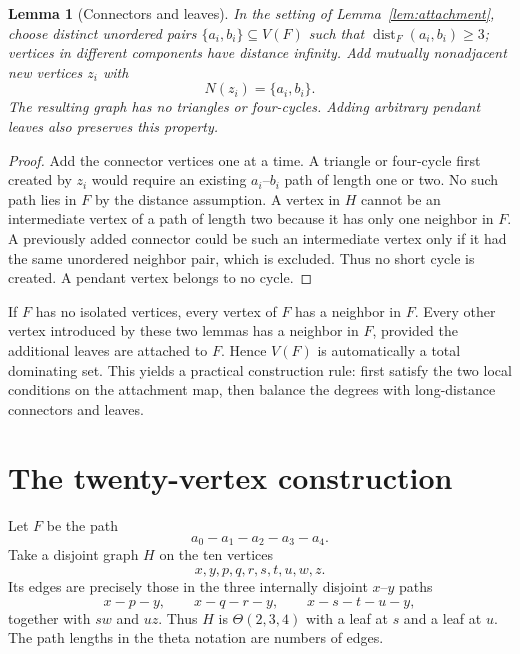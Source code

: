 \documentclass[11pt,a4paper]{article}
\newtheorem{lemma}[theorem]{Lemma}
\theoremstyle{definition}
\theoremstyle{remark}
\DeclareMathOperator{\dist}{dist}
\begin{document}
\begin{lemma}[Connectors and leaves]\label{lem:connectors}
In the setting of Lemma~\ref{lem:attachment}, choose distinct
unordered pairs $\{a_i,b_i\}\subseteq V(F)$ such that
$\dist_F(a_i,b_i)\ge3$; vertices in different components have
distance infinity. Add mutually nonadjacent new vertices $z_i$
with
\[
                  N(z_i)=\{a_i,b_i\}.
\]
The resulting graph has no triangles or four-cycles.
Adding arbitrary pendant leaves also preserves this property.
\end{lemma}

\begin{proof}
Add the connector vertices one at a time.
A triangle or four-cycle first created by $z_i$ would require an
existing $a_i$--$b_i$ path of length one or two. No such path lies
in $F$ by the distance assumption. A vertex in $H$ cannot be an
intermediate vertex of a path of length two because it has only
one neighbor in $F$. A previously added connector could be such
an intermediate vertex only if it had the same unordered
neighbor pair, which is excluded. Thus no short cycle is created.
A pendant vertex belongs to no cycle.
\end{proof}

If $F$ has no isolated vertices, every vertex of $F$ has a neighbor
in $F$. Every other vertex introduced by these two lemmas has a
neighbor in $F$, provided the additional leaves are attached to
$F$. Hence $V(F)$ is automatically a total dominating set.
This yields a practical construction rule: first satisfy the two
local conditions on the attachment map, then balance the degrees
with long-distance connectors and leaves.

\section{The twenty-vertex construction}
\label{sec:construction}

Let $F$ be the path
\[
                     a_0-a_1-a_2-a_3-a_4.
\]
Take a disjoint graph $H$ on the ten vertices
\[
                     x,y,p,q,r,s,t,u,w,z.
\]
Its edges are precisely those in the three internally disjoint
$x$--$y$ paths
\begin{equation}\label{eq:theta}
          x-p-y,\qquad x-q-r-y,\qquad x-s-t-u-y,
\end{equation}
together with $sw$ and $uz$. Thus $H$ is
$\Theta(2,3,4)$ with a leaf at $s$ and a leaf at $u$.
The path lengths in the theta notation are numbers of edges.
\end{document}
